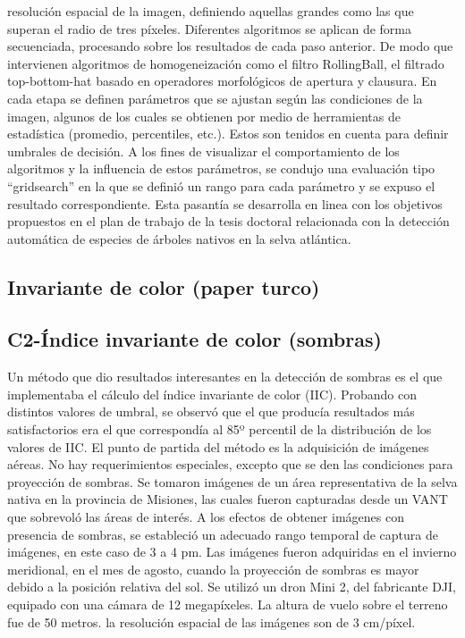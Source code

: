 resolución espacial de la imagen, definiendo aquellas grandes como las que superan el radio
de tres píxeles. Diferentes algoritmos se aplican de forma secuenciada, procesando sobre los
resultados de cada paso anterior. De modo que intervienen algoritmos de homogeneización
como el filtro RollingBall, el filtrado top-bottom-hat basado en operadores morfológicos de apertura y clausura. En cada etapa se definen parámetros que se ajustan según las condiciones
de la imagen, algunos de los cuales se obtienen por medio de herramientas de estadística
(promedio, percentiles, etc.). Estos son tenidos en cuenta para definir umbrales de decisión. A
los fines de visualizar el comportamiento de los algoritmos y la influencia de estos parámetros,
se condujo una evaluación tipo “gridsearch” en la que se definió un rango para cada parámetro
y se expuso el resultado correspondiente. Esta pasantía se desarrolla en linea con los objetivos
propuestos en el plan de trabajo de la tesis doctoral relacionada con la detección automática
de especies de árboles nativos en la selva atlántica. 
\color{cyan} %
\subsection{Invariante de color (paper turco)}
\color{cyan}
\subsection{C2-Índice invariante de color (sombras)}
Un método que dio resultados interesantes en la detección de sombras es el que implementaba el cálculo del índice invariante de color (IIC). Probando con distintos valores de umbral, se observó que el que producía resultados más satisfactorios era el que correspondía al 85º percentil de la distribución de los valores de IIC.
El punto de partida del método es la adquisición de imágenes aéreas. No hay requerimientos especiales, excepto que se den las condiciones para proyección de sombras. Se tomaron imágenes de un área representativa de la selva nativa en la provincia de Misiones, las cuales fueron capturadas desde un VANT que sobrevoló las áreas de interés. A los efectos de obtener imágenes con presencia de sombras, se estableció un adecuado rango temporal de captura de imágenes, en este caso de 3 a 4 pm. Las imágenes fueron adquiridas en el invierno meridional, en el mes de agosto, cuando la proyección de sombras es mayor debido a la posición relativa del sol. Se utilizó un dron Mini 2, del fabricante DJI, equipado con una cámara de 12 megapíxeles. La altura de vuelo sobre el terreno fue de 50 metros. la resolución espacial de las imágenes son de 3 cm/píxel.

